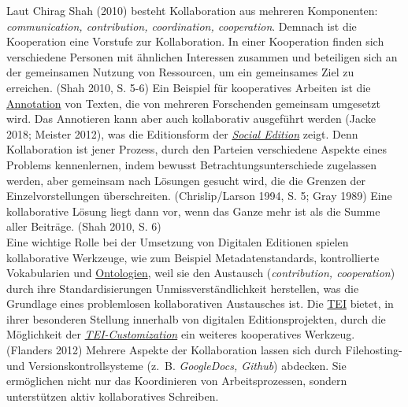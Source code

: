 \documentclass{article}
\begin{document}
        Laut Chirag Shah (2010) besteht Kollaboration aus mehreren Komponenten: \emph{communication, contribution, coordination, cooperation}. Demnach ist die Kooperation eine Vorstufe zur Kollaboration. In einer Kooperation finden sich verschiedene Personen mit ähnlichen Interessen zusammen und beteiligen sich an der gemeinsamen Nutzung von Ressourcen, um ein gemeinsames Ziel zu erreichen. (Shah 2010, S. 5-6) Ein Beispiel für kooperatives Arbeiten ist die \href{http://gams.uni-graz.at/o:konde.17}{Annotation} von Texten, die von  mehreren Forschenden gemeinsam umgesetzt wird. Das Annotieren kann aber auch kollaborativ ausgeführt werden (Jacke 2018; Meister 2012), was die Editionsform der \emph{\href{http://gams.uni-graz.at/o:konde.169}{Social Edition}} zeigt. Denn Kollaboration ist jener Prozess, durch den Parteien verschiedene Aspekte eines Problems kennenlernen, indem bewusst Betrachtungsunterschiede zugelassen werden, aber gemeinsam nach Lösungen gesucht wird, die die Grenzen der Einzelvorstellungen überschreiten. (Chrislip/Larson 1994, S. 5; Gray 1989) Eine kollaborative Lösung liegt dann vor, wenn das Ganze mehr ist als die Summe aller Beiträge. (Shah 2010, S. 6)\\
            
        Eine wichtige Rolle bei der Umsetzung von Digitalen Editionen spielen kollaborative Werkzeuge, wie zum Beispiel Metadatenstandards, kontrollierte Vokabularien und \href{http://gams.uni-graz.at/o:konde.151}{Ontologien}, weil sie den Austausch (\emph{contribution, cooperation}) durch ihre Standardisierungen Unmissverständlichkeit herstellen, was die Grundlage eines problemlosen kollaborativen Austausches ist. Die \href{http://gams.uni-graz.at/o:konde.178}{TEI} bietet, in ihrer besonderen Stellung innerhalb von digitalen Editionsprojekten, durch die Möglichkeit der \emph{\href{http://gams.uni-graz.at/o:konde.180}{TEI-Customization}} ein weiteres kooperatives Werkzeug. (Flanders 2012) Mehrere Aspekte der Kollaboration lassen sich durch Filehosting- und Versionskontrollsysteme (z. B.\emph{ GoogleDocs, Github}) abdecken. Sie ermöglichen nicht nur das Koordinieren von Arbeitsprozessen, sondern unterstützen aktiv kollaboratives Schreiben.\\
            
\end{document}
